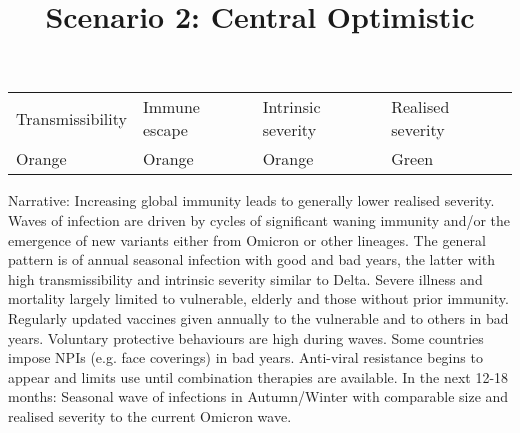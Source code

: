 \documentclass{article}
\begin{document}
\title{Scenario 2: Central Optimistic}

\maketitle





\begin{tabu} to \textwidth { |X|X|X|X| }
\hline



Transmissibility   & Immune escape  & Intrinsic severity & Realised severity
 \\


Orange & Orange & Orange & Green
 \\
\hline

\end{tabu}




Narrative: Increasing global immunity leads to generally lower realised severity. Waves of infection are driven by cycles of significant waning immunity and/or the emergence of new variants either from Omicron or other lineages. The general pattern is of annual seasonal infection with good and bad years, the latter with high transmissibility and intrinsic severity similar to Delta. Severe illness and mortality largely limited to vulnerable, elderly and those without prior immunity. Regularly updated vaccines given annually to the vulnerable and to others in bad years. Voluntary protective behaviours are high during waves. Some countries impose NPIs (e.g. face coverings) in bad years. Anti-viral resistance begins to appear and limits use until combination therapies are available. In the next 12-18 months: Seasonal wave of infections in Autumn/Winter with comparable size and realised severity to the current Omicron wave.
\end{document}
